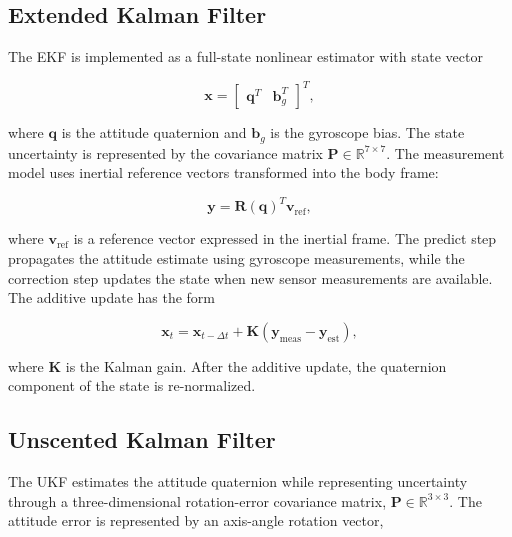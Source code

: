 \subsection{Extended Kalman Filter}
\label{app:adcs_ekf_filter}

The EKF is implemented as a full-state nonlinear estimator with state vector

\begin{equation}
    \mathbf{x}
    =
    \begin{bmatrix}
        \mathbf{q}^{T} &
        \mathbf{b}_{g}^{T}
    \end{bmatrix}^{T},
    \label{eq:app_adcs_ekf_state}
\end{equation}

where \(\mathbf{q}\) is the attitude quaternion and \(\mathbf{b}_{g}\) is the gyroscope bias. The state uncertainty is represented by the covariance matrix \(\mathbf{P}\in\mathbb{R}^{7\times7}\). The measurement model uses inertial reference vectors transformed into the body frame:

\begin{equation}
    \mathbf{y}
    =
    \mathbf{R}(\mathbf{q})^{T}
    \mathbf{v}_{\mathrm{ref}},
    \label{eq:app_adcs_ekf_measurement_model}
\end{equation}

where \(\mathbf{v}_{\mathrm{ref}}\) is a reference vector expressed in the inertial frame. The predict step propagates the attitude estimate using gyroscope measurements, while the correction step updates the state when new sensor measurements are available. The additive update has the form

\begin{equation}
    \mathbf{x}_{t}
    =
    \mathbf{x}_{t-\Delta t}
    +
    \mathbf{K}
    \left(
        \mathbf{y}_{\mathrm{meas}}
        -
        \mathbf{y}_{\mathrm{est}}
    \right),
    \label{eq:app_adcs_ekf_additive_update}
\end{equation}

where \(\mathbf{K}\) is the Kalman gain. After the additive update, the quaternion component of the state is re-normalized.

\subsection{Unscented Kalman Filter}
\label{app:adcs_ukf_filter}

The UKF estimates the attitude quaternion while representing uncertainty through a three-dimensional rotation-error covariance matrix, \(\mathbf{P}\in\mathbb{R}^{3\times3}\). The attitude error is represented by an axis-angle rotation vector,

